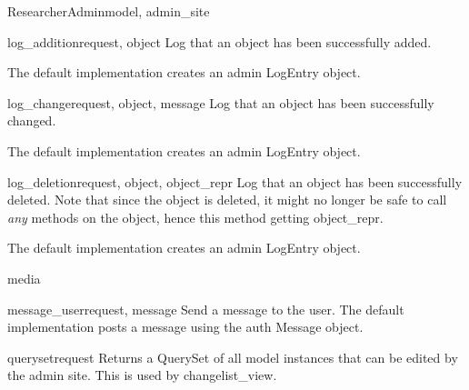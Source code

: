\documentclass[letterpaper,10pt,english]{sphinxmanual}
\begin{document}
\begin{classdesc}{ResearcherAdmin}{model, admin\_site}
\hypertarget{data.admin.ResearcherAdmin.log_addition}{}\begin{methoddesc}{log\_addition}{request, object}
Log that an object has been successfully added.

The default implementation creates an admin LogEntry object.
\end{methoddesc}

\hypertarget{data.admin.ResearcherAdmin.log_change}{}\begin{methoddesc}{log\_change}{request, object, message}
Log that an object has been successfully changed.

The default implementation creates an admin LogEntry object.
\end{methoddesc}

\hypertarget{data.admin.ResearcherAdmin.log_deletion}{}\begin{methoddesc}{log\_deletion}{request, object, object\_repr}
Log that an object has been successfully deleted. Note that since the
object is deleted, it might no longer be safe to call \emph{any} methods
on the object, hence this method getting object\_repr.

The default implementation creates an admin LogEntry object.
\end{methoddesc}

\hypertarget{data.admin.ResearcherAdmin.media}{}\begin{memberdesc}{media}\end{memberdesc}

\hypertarget{data.admin.ResearcherAdmin.message_user}{}\begin{methoddesc}{message\_user}{request, message}
Send a message to the user. The default implementation
posts a message using the auth Message object.
\end{methoddesc}

\hypertarget{data.admin.ResearcherAdmin.queryset}{}\begin{methoddesc}{queryset}{request}
Returns a QuerySet of all model instances that can be edited by the
admin site. This is used by changelist\_view.
\end{methoddesc}


\end{classdesc}
\end{document}
